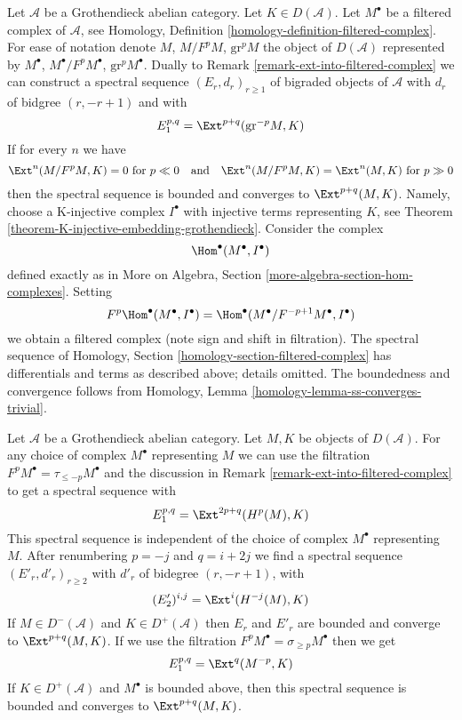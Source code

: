\begin{remark}
\label{remark-ext-from-filtered-complex}
Let $\mathcal{A}$ be a Grothendieck abelian category. Let
$K \in D(\mathcal{A})$. Let $M^\bullet$ be a filtered complex of
$\mathcal{A}$, see Homology, Definition
\ref{homology-definition-filtered-complex}.
For ease of notation denote $M$, $M/F^pM$, $\text{gr}^pM$ the
object of $D(\mathcal{A})$ represented by $M^\bullet$,
$M^\bullet/F^pM^\bullet$, $\text{gr}^pM^\bullet$.
Dually to Remark \ref{remark-ext-into-filtered-complex}
we can construct a spectral sequence $(E_r, d_r)_{r \geq 1}$
of bigraded objects of $\mathcal{A}$ with $d_r$ of bidgree
$(r, -r + 1)$ and
with
$$
E_1^{p, q} = \Ext^{p + q}(\text{gr}^{-p}M, K)
$$
If for every $n$ we have
$$
\Ext^n(M/F^pM, K) = 0 \text{ for } p \ll 0
\quad\text{and}\quad
\Ext^n(M/F^pM, K) = \Ext^n(M, K) \text{ for } p \gg 0
$$
then the spectral sequence is bounded and converges to $\Ext^{p + q}(M, K)$.
Namely, choose a K-injective complex $I^\bullet$ with injective terms
representing $K$, see Theorem \ref{theorem-K-injective-embedding-grothendieck}.
Consider the complex
$$
\Hom^\bullet(M^\bullet, I^\bullet)
$$
defined exactly as in
More on Algebra, Section \ref{more-algebra-section-hom-complexes}.
Setting
$$
F^p\Hom^\bullet(M^\bullet, I^\bullet) =
\Hom^\bullet(M^\bullet/F^{-p + 1}M^\bullet, I^\bullet)
$$
we obtain a filtered complex (note sign and shift in filtration).
The spectral sequence of
Homology, Section \ref{homology-section-filtered-complex}
has differentials and terms as described above; details omitted.
The boundedness and convergence follows from
Homology, Lemma \ref{homology-lemma-ss-converges-trivial}.
\end{remark}

\begin{remark}
\label{remark-spectral-sequences-ext-variant}
Let $\mathcal{A}$ be a Grothendieck abelian category.
Let $M, K$ be objects of $D(\mathcal{A})$.
For any choice of complex $M^\bullet$ representing $M$ we
can use the filtration $F^pM^\bullet = \tau_{\leq -p}M^\bullet$
and the discussion in Remark \ref{remark-ext-into-filtered-complex}
to get a spectral sequence with
$$
E_1^{p, q} = \Ext^{2p + q}(H^p(M), K)
$$
This spectral sequence is independent of the choice of complex $M^\bullet$
representing $M$. After renumbering $p = -j$ and $q = i + 2j$ we find a
spectral sequence $(E'_r, d'_r)_{r \geq 2}$ with $d'_r$ of bidegree
$(r, -r + 1)$, with
$$
(E'_2)^{i, j} = \Ext^i(H^{-j}(M), K)
$$
If $M \in D^-(\mathcal{A})$ and $K \in D^+(\mathcal{A})$
then $E_r$ and $E'_r$ are bounded and converge to $\Ext^{p + q}(M, K)$.
If we use the filtration $F^pM^\bullet = \sigma_{\geq p}M^\bullet$
then we get
$$
E_1^{p, q} = \Ext^q(M^{-p}, K)
$$
If $K \in D^+(\mathcal{A})$ and $M^\bullet$ is bounded above, then
this spectral sequence is bounded and converges to $\Ext^{p + q}(M, K)$.
\end{remark}

